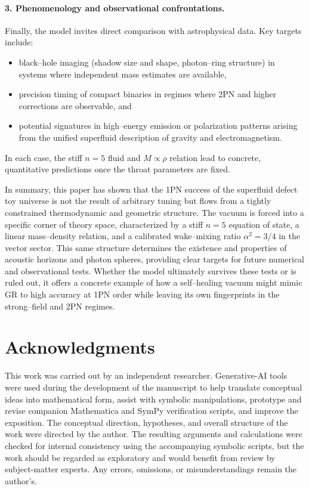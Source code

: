 \documentclass[11pt]{article}
\begin{document}
\paragraph{3. Phenomenology and observational confrontations.}
Finally, the model invites direct comparison with astrophysical data.  Key
targets include:
\begin{itemize}
  \item black--hole imaging (shadow size and shape, photon--ring
        structure) in systems where independent mass estimates are
        available,
  \item precision timing of compact binaries in regimes where 2PN and
        higher corrections are observable, and
  \item potential signatures in high--energy emission or polarization
        patterns arising from the unified superfluid description of
        gravity and electromagnetism.
\end{itemize}
In each case, the stiff \(n=5\) fluid and \(M \propto \rho\) relation
lead to concrete, quantitative predictions once the throat parameters
are fixed.

\vspace{0.5em}
\noindent In summary, this paper has shown that the 1PN success of the
superfluid defect toy universe is not the result of arbitrary tuning but
flows from a tightly constrained thermodynamic and geometric structure.  The
vacuum is forced into a specific corner of theory space, characterized by a
stiff \(n=5\) equation of state, a linear mass--density relation, and a
calibrated wake--mixing ratio \(\alpha^2=3/4\) in the vector sector.  This same
structure determines the existence and properties of acoustic horizons and
photon spheres, providing clear targets for future numerical and
observational tests.  Whether the model ultimately survives these tests or
is ruled out, it offers a concrete example of how a self--healing vacuum
might mimic GR to high accuracy at 1PN order while leaving its own
fingerprints in the strong--field and 2PN regimes.

\section*{Acknowledgments}
This work was carried out by an independent researcher. Generative-AI tools were used during the development of the manuscript to help translate conceptual ideas into mathematical form, assist with symbolic manipulations, prototype and revise companion Mathematica and SymPy verification scripts, and improve the exposition. The conceptual direction, hypotheses, and overall structure of the work were directed by the author. The resulting arguments and calculations were checked for internal consistency using the accompanying symbolic scripts, but the work should be regarded as exploratory and would benefit from review by subject-matter experts. Any errors, omissions, or misunderstandings remain the author's.
\end{document}
